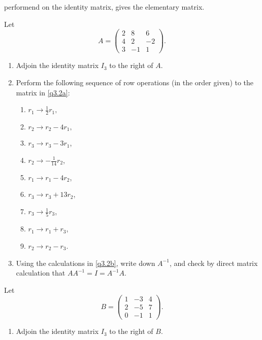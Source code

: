 \documentclass[english,12pt,a4paper]{scrartcl}
\newenvironment{modenumerate}
  {\enumerate\setupmodenumerate}
  {\endenumerate}
\newif\ifmoditem
\newcommand{\setupmodenumerate}{%
  \global\moditemfalse
  \let\origmakelabel\makelabel
  \def\moditem##1{\global\moditemtrue\def\mesymbol{##1}\item}%
  \def\makelabel##1{%
  \origmakelabel{##1\ifmoditem\rlap{\mesymbol}\fi\enspace}%
\global\moditemfalse}%
}
\begin{document}
\begin{modenumerate}
    performend on the identity matrix, gives the elementary matrix.
  \moditem{*} Let
    \[
      A =
      \begin{pmatrix}
        2 & 8 & 6 \\
        4 & 2 & -2 \\
        3 & -1 & 1
      \end{pmatrix}.
    \]
    \begin{enumerate}[label=(\alph*),ref=(\alph*)]
      \item \label{q3.2a} Adjoin the identity matrix $I_3$ to the right of $A$.
      \item \label{q3.2b} Perform the following sequence of row operations (in 
        the order given) to the matrix in \ref{q3.2a}:
        \begin{multicols}{3}[\setlength{\columnseprule}{0pt}]
          \begin{enumerate}[label=(\roman*),ref=(\roman*)]
            \item $r_1 \to \frac{1}{2} r_1,$
            \item $r_2 \to r_2 - 4r_1,$
            \item $r_3 \to r_3 - 3r_1$,
            \item $r_2 \to -\frac{1}{14} r_2$,
            \item $r_1 \to r_1 - 4r_2$,
            \item $r_3 \to r_3 + 13r_2$,
            \item $r_3 \to \frac{1}{5} r_3$,
            \item $r_1 \to r_1 + r_3$,
            \item $r_2 \to r_2 - r_3$.
          \end{enumerate}
        \end{multicols}
      \item Using the calculations in \ref{q3.2b}, write down $A^{-1}$, and 
        check by direct matrix calculation that $AA^{-1} = I = A^{-1}A$.
    \end{enumerate}
  \item Let
    \[
      B =
      \begin{pmatrix}
        1 & -3 & 4 \\
        2 & -5 & 7 \\
        0 & -1 & 1
      \end{pmatrix}.
    \]
    \begin{enumerate}[label=(\alph*),ref=(\alph*)]
      \item \label{q3.3a} Adjoin the identity matrix $I_3$ to the right of $B$.

\end{enumerate}
\end{modenumerate}
\end{document}
